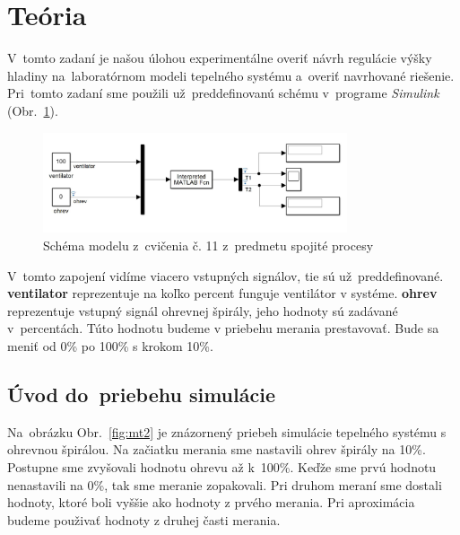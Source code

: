 \documentclass{article}
\begin{document}
\section{Teória}
\label{sec:teoria}

V~tomto zadaní je našou úlohou experimentálne overiť návrh regulácie výšky hladiny na~laboratórnom
modeli tepelného systému a~overiť navrhované riešenie. Pri~tomto zadaní sme použili už~preddefinovanú schému
v~programe \textit{Simulink} (Obr.~\ref{fig:schema}).

\begin{figure}[!htbp]
	\begin{center}
		\includegraphics[width=0.8\textwidth]{./include/schema.png}
	\end{center}
	\caption{Schéma modelu z~cvičenia č. 11 z~predmetu spojité procesy}
	\label{fig:schema}
\end{figure}

V~tomto zapojení vidíme viacero vstupných signálov, tie sú už~preddefinované. \textbf{ventilator} reprezentuje
na koľko percent funguje ventilátor v systéme. \textbf{ohrev} reprezentuje vstupný signál ohrevnej špirály,
jeho hodnoty sú zadávané v~percentách. Túto hodnotu budeme v priebehu merania prestavovať. Bude sa meniť
od 0\% po 100\% s krokom 10\%.

\clearpage

\subsection{Úvod do~priebehu simulácie}
\label{subsec:priebehSimulacie}

Na~obrázku Obr.~\ref{fig:mt2} je znázornený priebeh simulácie tepelného systému s ohrevnou špirálou. Na začiatku
merania sme nastavili ohrev špirály na 10\%. Postupne sme zvyšovali hodnotu ohrevu až k~100\%. Keďže sme prvú
hodnotu nenastavili na 0\%, tak sme meranie zopakovali. Pri druhom meraní sme dostali hodnoty, ktoré boli vyššie
ako hodnoty z prvého merania. Pri aproximácia budeme použivať hodnoty z druhej časti merania.
\end{document}
